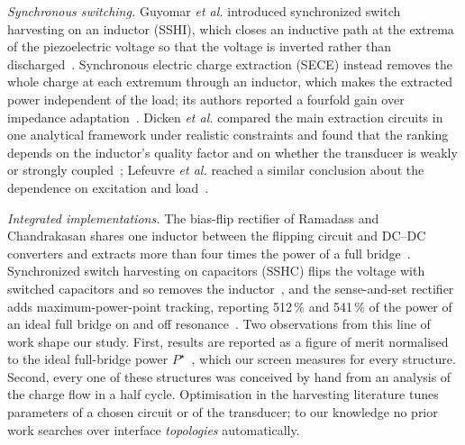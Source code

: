 \documentclass[journal]{IEEEtran}
\begin{document}
\emph{Synchronous switching.} Guyomar \emph{et al.} introduced synchronized switch harvesting on an
inductor (SSHI), which closes an inductive path at the extrema of the piezoelectric voltage so that the
voltage is inverted rather than discharged~\cite{guyomar2005sshi}. Synchronous electric charge
extraction (SECE) instead removes the whole charge at each extremum through an inductor, which makes the
extracted power independent of the load; its authors reported a fourfold gain over impedance
adaptation~\cite{lefeuvre2005sece}. Dicken \emph{et al.} compared the main extraction circuits in one
analytical framework under realistic constraints and found that the ranking depends on the inductor's
quality factor and on whether the transducer is weakly or strongly coupled~\cite{dicken2012power};
Lefeuvre \emph{et al.} reached a similar conclusion about the dependence on excitation and
load~\cite{lefeuvre2006comparison}.

\emph{Integrated implementations.} The bias-flip rectifier of Ramadass and Chandrakasan shares one
inductor between the flipping circuit and DC--DC converters and extracts more than four times the power of
a full bridge~\cite{ramadass2010biasflip}. Synchronized switch harvesting on capacitors (SSHC) flips the
voltage with switched capacitors and so removes the inductor~\cite{du2017sshc}, and the sense-and-set
rectifier adds maximum-power-point tracking, reporting 512\,\% and 541\,\% of the power of an ideal full
bridge on and off resonance~\cite{peng2019senseset}. Two observations from this line of work shape our
study. First, results are reported as a figure of merit normalised to the ideal full-bridge power
$P^\star$~\cite{ramadass2010biasflip,peng2019senseset}, which our screen measures for every structure.
Second, every one of these structures was conceived by hand from an analysis of the charge flow in a half
cycle. Optimisation in the harvesting literature tunes parameters of a chosen circuit or of the
transducer; to our knowledge no prior work searches over interface \emph{topologies} automatically.
\end{document}
